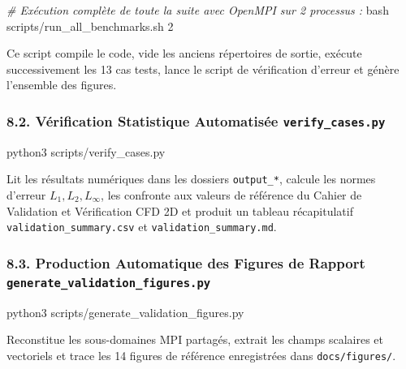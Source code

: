 \documentclass[
  french,
]{article}
\newenvironment{Shaded}{}{}
\newcommand{\CommentTok}[1]{\textcolor[rgb]{0.38,0.63,0.69}{\textit{#1}}}
\newcommand{\ExtensionTok}[1]{#1}
\newcommand{\FunctionTok}[1]{\textcolor[rgb]{0.02,0.16,0.49}{#1}}
\newcommand{\NormalTok}[1]{#1}
\begin{document}
\begin{Shaded}
\begin{Highlighting}[]
\CommentTok{\# Exécution complète de toute la suite avec OpenMPI sur 2 processus :}
\FunctionTok{bash}\NormalTok{ scripts/run\_all\_benchmarks.sh 2}
\end{Highlighting}
\end{Shaded}

Ce script compile le code, vide les anciens répertoires de sortie,
exécute successivement les 13 cas tests, lance le script de vérification
d'erreur et génère l'ensemble des figures.

\subsubsection{\texorpdfstring{8.2. Vérification Statistique Automatisée
\texttt{verify\_cases.py}}{8.2. Vérification Statistique Automatisée verify\_cases.py}}\label{vuxe9rification-statistique-automatisuxe9e-verify_cases.py}

\begin{Shaded}
\begin{Highlighting}[]
\ExtensionTok{python3}\NormalTok{ scripts/verify\_cases.py}
\end{Highlighting}
\end{Shaded}

Lit les résultats numériques dans les dossiers \texttt{output\_*},
calcule les normes d'erreur \(L_1, L_2, L_\infty\), les confronte aux
valeurs de référence du Cahier de Validation et Vérification CFD 2D et
produit un tableau récapitulatif \texttt{validation\_summary.csv} et
\texttt{validation\_summary.md}.

\subsubsection{\texorpdfstring{8.3. Production Automatique des Figures
de Rapport
\texttt{generate\_validation\_figures.py}}{8.3. Production Automatique des Figures de Rapport generate\_validation\_figures.py}}\label{production-automatique-des-figures-de-rapport-generate_validation_figures.py}

\begin{Shaded}
\begin{Highlighting}[]
\ExtensionTok{python3}\NormalTok{ scripts/generate\_validation\_figures.py}
\end{Highlighting}
\end{Shaded}

Reconstitue les sous-domaines MPI partagés, extrait les champs scalaires
et vectoriels et trace les 14 figures de référence enregistrées dans
\texttt{docs/figures/}.
\end{document}
